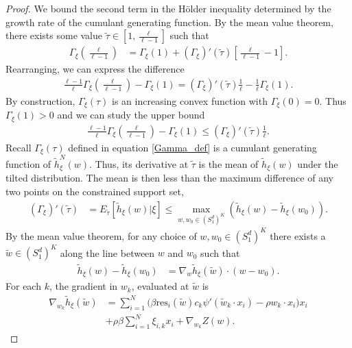 \documentclass{article}
\numberwithin{equation}{section}
\theoremstyle{Lemma}
\theoremstyle{Corollary}
\theoremstyle{Theorem}
\theoremstyle{Remark}
\begin{document}
\begin{proof}
    We bound the second term in the H{\"o}lder inequality determined by the growth rate of the cumulant generating function. By the mean value theorem, there exists some value $\tilde{\tau} \in [1, \frac{\ell}{\ell-1}]$ such that
    \begin{align}
        \Gamma_{\xi}(\frac{\ell}{\ell-1})&= \Gamma_{\xi}(1)+(\Gamma_{\xi})'(\tilde{\tau})[\frac{\ell}{\ell-1}-1].
    \end{align}
Rearranging, we can express the difference
\begin{align}
    \frac{\ell-1}{\ell}\Gamma_{\xi}(\frac{\ell}{\ell-1})-\Gamma_{\xi}(1)=(\Gamma_{\xi})'(\tilde{\tau})\frac{1}{\ell}-\frac{1}{\ell}\Gamma_{\xi}(1).
\end{align}
By construction, $\Gamma_{\xi}(\tau)$ is an increasing convex function with $\Gamma_{\xi}(0)=0$. Thus $\Gamma_{\xi}(1)>0$ and we can study the upper bound
\begin{align}
    \frac{\ell-1}{\ell}\Gamma_{\xi}(\frac{\ell}{\ell-1})-\Gamma_{\xi}(1)\leq(\Gamma_{\xi})'(\tilde{\tau})\frac{1}{\ell}.
\end{align}
Recall $\Gamma_{\xi}(\tau)$ defined in equation \eqref{Gamma_def} is a cumulant generating function of $\tilde{h}^{N}_{\xi}(w)$. Thus, its derivative at $\tilde{\tau}$ is the mean of $\tilde{h}_{\xi}(w)$ under the tilted distribution. The mean is then less than the maximum difference of any two points on the constrained support set,
\begin{align}
    (\Gamma_{\xi})'(\tilde{\tau})&= E_{\tilde{\tau}}[\tilde{h}_{\xi}(w)|\xi]\leq \max_{w, w_{0} \in (S^{d}_{1})^{ K}}(\tilde{h}_{\xi}(w)-\tilde{h}_{\xi}(w_{0})).
\end{align}
By the mean value theorem, for any choice of $w, w_{0}
\in (S^{d}_{1})^{K}$ there exists a $\tilde{w} \in (S^{d}_{1})^{K}$ along the line between $w$ and $w_{0}$ such that
\begin{align}
    \tilde{h}_{\xi}(w)-\tilde{h}_{\xi}(w_{0})&= \nabla_{w}\tilde{h}_{\xi}(\tilde{w})\cdot(w-w_{0}).
\end{align}
For each $k$, the gradient in $w_{k}$, evaluated at $\tilde{w}$ is
\begin{align}
    \nabla_{w_{k}}\tilde{h}_{\xi}(\tilde{w})&= \sum_{i=1}^{N}\big(\beta\text{res}_{i}(\tilde{w})c_{k}\psi'(\tilde {w}_{k}\cdot x_{i}) -\rho w_{k}\cdot x_{i}\big)x_{i}\label{Holder_lemma_2_T1}\\
    &+\rho\beta \sum_{i=1}^{N}\xi_{i,k}x_{i}+\nabla_{w_{k}}Z(w).
\end{align}

\end{proof}
\end{document}
